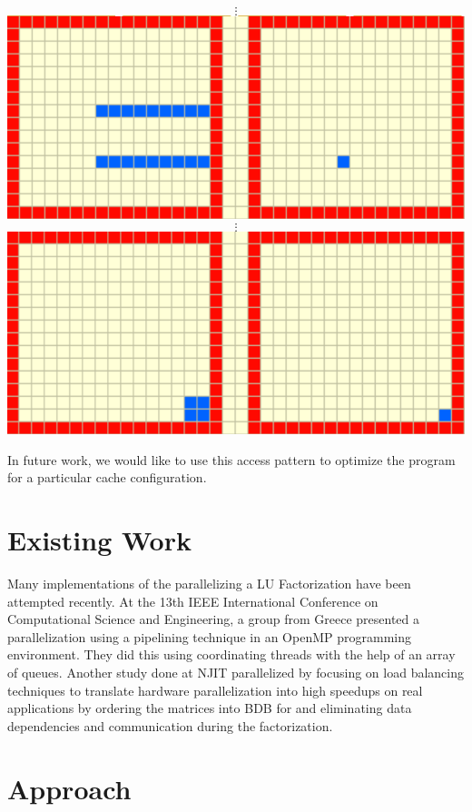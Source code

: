 \documentclass[12]{article}
\begin{document}
\begin{center}
$$\vdots$$
\includegraphics[scale=0.33]{figures/lu6}
$$\vdots$$
\includegraphics[scale=0.33]{figures/lu7}
\end{center}

In future work, we would like to use this access pattern to optimize the program for a particular cache configuration.

\section{Existing Work}

Many implementations of the parallelizing a LU Factorization have been attempted recently. At the 13th IEEE International Conference on Computational Science and Engineering, a group from Greece presented a parallelization using a pipelining technique in an OpenMP programming environment. They did this using coordinating threads with the help of an array of queues.  Another study done at NJIT parallelized by focusing on load balancing techniques to translate hardware parallelization into high speedups on real applications by ordering the matrices into BDB for and eliminating data dependencies and communication during the factorization. 

\section{Approach}
\end{document}
